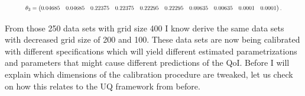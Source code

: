 \begin{equation*}
	\resizebox{.9\hsize}{!}{$\theta_3 = \begin{pmatrix}
		0.04685 & 0.04685 & 0.22375 & 0.22375 & 0.22295	& 0.22295 & 0.00635 & 0.00635 & 0.0001 & 0.0001
		\end{pmatrix}.$}
\end{equation*}

From those 250 data sets with grid size 400 I know derive the same data sets with decreased grid size of 200 and 100. These data sets are now being calibrated with different specifications which will yield different estimated parametrizations and parameters that might cause different predictions of the QoI. Before I will explain which dimensions of the calibration procedure are tweaked, let us check on how this relates to the UQ framework from before.

